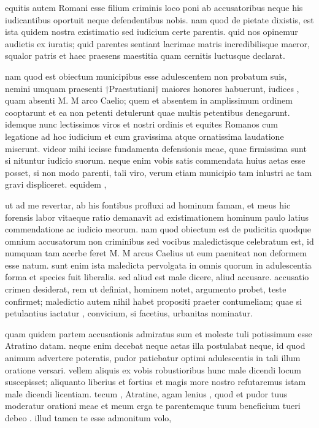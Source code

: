  equitis autem Romani esse filium criminis loco poni ab accusatoribus neque his iudicantibus oportuit neque defendentibus nobis. nam quod de pietate dixistis, est ista quidem nostra existimatio sed iudicium certe parentis. quid nos opinemur audietis ex iuratis; quid parentes sentiant lacrimae matris incredibilisque maeror, squalor patris et haec praesens maestitia quam cernitis luctusque declarat.

 nam quod est obiectum municipibus esse adulescentem non probatum suis, nemini umquam praesenti †Praestutiani† maiores honores habuerunt, iudices , quam absenti M. M arco Caelio; quem et absentem in amplissimum ordinem cooptarunt et ea non petenti detulerunt quae multis petentibus denegarunt. idemque nunc lectissimos viros et nostri ordinis et equites Romanos cum legatione ad hoc iudicium et cum gravissima atque ornatissima laudatione miserunt. videor mihi iecisse fundamenta defensionis meae, quae firmissima sunt si nituntur iudicio suorum. neque enim vobis satis commendata huius aetas esse posset, si non modo parenti, tali viro, verum etiam municipio tam inlustri ac tam gravi displiceret. equidem ,

 ut ad me revertar, ab his fontibus profluxi ad hominum famam, et meus hic forensis labor vitaeque ratio demanavit ad existimationem hominum paulo latius commendatione ac iudicio meorum. nam quod obiectum est de pudicitia quodque omnium accusatorum non criminibus sed vocibus maledictisque celebratum est, id numquam tam acerbe feret M. M arcus Caelius ut eum paeniteat non deformem esse natum. sunt enim ista maledicta pervolgata in omnis quorum in adulescentia forma et species fuit liberalis. sed aliud est male dicere, aliud accusare. accusatio crimen desiderat, rem ut definiat, hominem notet, argumento probet, teste confirmet; maledictio autem nihil habet propositi praeter contumeliam; quae si petulantius iactatur , convicium, si facetius, urbanitas nominatur.

 quam quidem partem accusationis admiratus sum et moleste tuli potissimum esse Atratino datam. neque enim decebat neque aetas illa postulabat neque, id quod animum advertere poteratis, pudor patiebatur optimi adulescentis in tali illum oratione versari. vellem aliquis ex vobis robustioribus hunc male dicendi locum suscepisset; aliquanto liberius et fortius et magis more nostro refutaremus istam male dicendi licentiam. tecum , Atratine, agam lenius , quod et pudor tuus moderatur orationi meae et meum erga te parentemque tuum beneficium tueri debeo . illud tamen te esse admonitum volo,

